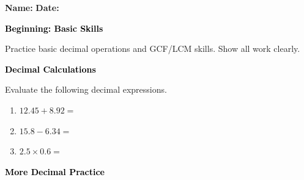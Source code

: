 \documentclass[12pt, letterpaper, fleqn]{article}
\newcommand{\blank}{\underline{\hspace{2.2cm}}}
\begin{document}
\textbf{Name:} \underline{\hspace{5cm}}
\hfill
\textbf{Date:} \underline{\hspace{3cm}}\\

\begin{tcolorbox}[colback=black!10]
    \large\textcolor{black}{\textbf{Beginning: Basic Skills}}
\end{tcolorbox}

\vspace{3mm}

\noindent
Practice basic decimal operations and GCF/LCM skills. Show all work clearly.

\vspace{4mm}

\begin{tcolorbox}[colback=black!10]
\large\textcolor{black}{\textbf{Decimal Calculations}}
\end{tcolorbox}

\noindent
Evaluate the following decimal expressions.

\vspace{3mm}
\begin{enumerate}[itemsep=2.2cm, leftmargin=0.6cm]
\item $12.45 + 8.92 = $ \blank

\vspace{2cm}

\item $15.8 - 6.34 = $ \blank

\vspace{2cm}

\item $2.5 \times 0.6 = $ \blank

\vspace{2cm}

\end{enumerate}

\newpage

\begin{tcolorbox}[colback=black!10]
\large\textcolor{black}{\textbf{More Decimal Practice}}
\end{tcolorbox}
\end{document}
